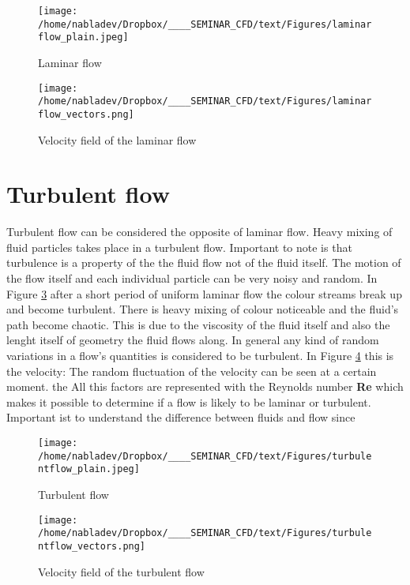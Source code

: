 \begin{figure}[htp]
\centering
\texttt{[image: /home/nabladev/Dropbox/\_\_\_\_SEMINAR\_CFD/text/Figures/laminarflow\_plain.jpeg]}
\caption{Laminar flow}
\label{fig:LaminarFlowPlain}
\end{figure}

\begin{figure}[htp]
\centering
\texttt{[image: /home/nabladev/Dropbox/\_\_\_\_SEMINAR\_CFD/text/Figures/laminarflow\_vectors.png]}
\caption{Velocity field of the laminar flow}
\label{LaminarFlowVector}
\end{figure}



\section{Turbulent flow}

Turbulent flow can be considered the opposite of laminar flow. Heavy mixing of fluid particles takes place in a turbulent flow. Important to note is that turbulence is a property of the the fluid flow not of the fluid itself. The motion of the flow itself and
each individual particle can be very noisy and random. In Figure \ref{fig:TurbulentFlowPlain} after a short period of uniform laminar flow the colour streams break up
and become turbulent. There is heavy mixing of colour noticeable and the fluid's path become chaotic. This is due to the viscosity of the fluid itself and also the lenght itself of geometry the fluid
flows along. In general any kind of random variations in a flow's quantities is considered to be turbulent. In Figure \ref{fig:TurbulentFlowVector} this is the velocity: The random fluctuation of the velocity can be seen at a certain moment. the All this factors are represented with the Reynolds number \textbf{Re} which makes it possible to determine if a flow is likely to be laminar or
turbulent. Important ist to understand the difference between fluids and flow since 


\begin{figure}[htp]
\centering
\texttt{[image: /home/nabladev/Dropbox/\_\_\_\_SEMINAR\_CFD/text/Figures/turbulentflow\_plain.jpeg]}
\caption{Turbulent flow}
\label{fig:TurbulentFlowPlain}
\end{figure}



\begin{figure}[htp]
\centering
\texttt{[image: /home/nabladev/Dropbox/\_\_\_\_SEMINAR\_CFD/text/Figures/turbulentflow\_vectors.png]}
\caption{Velocity field of the turbulent flow}
\label{fig:TurbulentFlowVector}
\end{figure}

